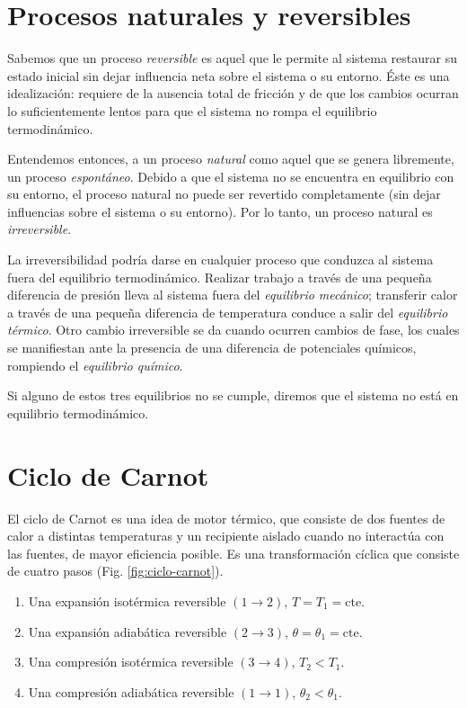 \documentclass[openany]{book}
\begin{document}
\section{Procesos naturales y reversibles}
Sabemos que un proceso \emph{reversible} es aquel que le permite al sistema restaurar su estado inicial sin dejar influencia neta sobre el sistema o su entorno. Éste es una idealización: requiere de la ausencia total de fricción y de que los cambios ocurran lo suficientemente lentos para que el sistema no rompa el equilibrio termodinámico.
\par Entendemos entonces, a un proceso \emph{natural} como aquel que se genera libremente, un proceso \emph{espontáneo}. Debido a que el sistema no se encuentra en equilibrio con su entorno, el proceso natural no puede ser revertido completamente (sin dejar influencias sobre el sistema o su entorno). Por lo tanto, un proceso natural es \emph{irreversible}.
\par La irreversibilidad podría darse en cualquier proceso que conduzca al sistema fuera del equilibrio termodinámico. Realizar trabajo a través de una pequeña diferencia de presión lleva al sistema fuera del \emph{equilibrio mecánico}; transferir calor a través de una pequeña diferencia de temperatura conduce a salir del \emph{equilibrio térmico}. Otro cambio irreversible se da cuando ocurren cambios de fase, los cuales se manifiestan ante la presencia de una diferencia de potenciales químicos, rompiendo el \emph{equilibrio químico}.
\par Si alguno de estos tres equilibrios no se cumple, diremos que el sistema no está en equilibrio termodinámico.

\section{Ciclo de Carnot}
El ciclo de Carnot es una idea de motor térmico, que consiste de dos fuentes de calor a distintas temperaturas y un recipiente aislado cuando no interactúa con las fuentes, de mayor eficiencia posible. Es una transformación cíclica que consiste de cuatro pasos (Fig. \ref{fig:ciclo-carnot}).
\renewcommand{\theenumi}{\arabic{enumi}}
\renewcommand{\labelenumi}{\theenumi.}
\begin{enumerate}
	\item Una expansión isotérmica reversible $(1\rightarrow2)$, $T=T_1=\mathrm{cte}$.
	\item Una expansión adiabática reversible $(2\rightarrow3)$, $\theta=\theta_1=\mathrm{cte}$.
	\item Una compresión isotérmica reversible $(3\rightarrow4)$, $T_2<T_1$.
	\item Una compresión adiabática reversible $(1\rightarrow1)$, $\theta_2<\theta_1$.
\end{enumerate}
\end{document}

